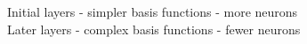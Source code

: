 \documentclass[preview]{standalone}
\begin{document}
Initial layers - simpler basis functions - more neurons\\Later layers - complex basis functions - fewer neurons\\
\end{document}
